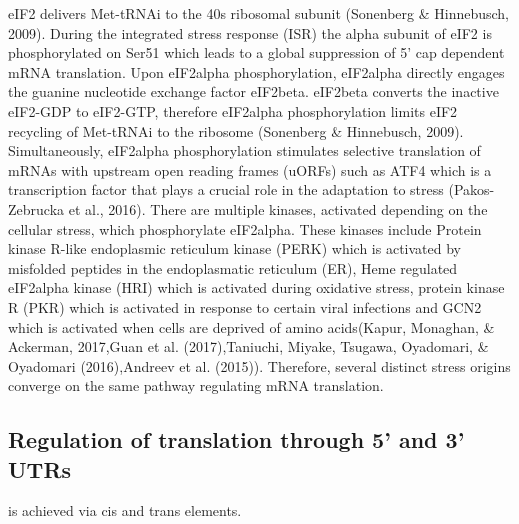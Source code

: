 \documentclass[12pt,openany]{book}
\begin{document}
eIF2 delivers Met-tRNAi to the 40s ribosomal subunit (Sonenberg \&
Hinnebusch, 2009). During the integrated stress response (ISR) the alpha
subunit of eIF2 is phosphorylated on Ser51 which leads to a global
suppression of 5' cap dependent mRNA translation. Upon eIF2alpha
phosphorylation, eIF2alpha directly engages the guanine nucleotide
exchange factor eIF2beta. eIF2beta converts the inactive eIF2-GDP to
eIF2-GTP, therefore eIF2alpha phosphorylation limits eIF2 recycling of
Met-tRNAi to the ribosome (Sonenberg \& Hinnebusch, 2009).
Simultaneously, eIF2alpha phosphorylation stimulates selective
translation of mRNAs with upstream open reading frames (uORFs) such as
ATF4 which is a transcription factor that plays a crucial role in the
adaptation to stress (Pakos-Zebrucka et al., 2016). There are multiple
kinases, activated depending on the cellular stress, which phosphorylate
eIF2alpha. These kinases include Protein kinase R-like endoplasmic
reticulum kinase (PERK) which is activated by misfolded peptides in the
endoplasmatic reticulum (ER), Heme regulated eIF2alpha kinase (HRI)
which is activated during oxidative stress, protein kinase R (PKR) which
is activated in response to certain viral infections and GCN2 which is
activated when cells are deprived of amino acids(Kapur, Monaghan, \&
Ackerman, 2017,Guan et al. (2017),Taniuchi, Miyake, Tsugawa, Oyadomari,
\& Oyadomari (2016),Andreev et al. (2015)). Therefore, several distinct
stress origins converge on the same pathway regulating mRNA translation.

\subsection{Regulation of translation through 5’ and 3’ UTRs}

is achieved via cis and trans elements.
\end{document}
